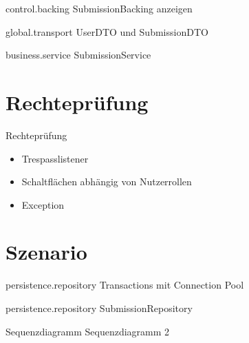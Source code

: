 \documentclass{beamer}
\begin{document}
    \begin{frame}{control.backing}
        \centering
        SubmissionBacking anzeigen
    \end{frame}

    \begin{frame}{global.transport}
        \centering
        UserDTO und SubmissionDTO
    \end{frame}

    \begin{frame}{business.service}
        \centering
        SubmissionService
    \end{frame}

    \section{Rechteprüfung}

    \begin{frame}{Rechteprüfung}
        \begin{itemize}
            \item Trespasslistener \pause
            \item Schaltflächen abhängig von Nutzerrollen \pause
            \item Exception
        \end{itemize}
    \end{frame}

    \section{Szenario}
    \begin{frame}{persistence.repository}
        \centering
        Transactions mit Connection Pool
    \end{frame}

    \begin{frame}{persistence.repository}
        \centering
        SubmissionRepository
    \end{frame}

    \begin{frame}{Sequenzdiagramm}
        \centering
        Sequenzdiagramm 2
    \end{frame}
\end{document}
